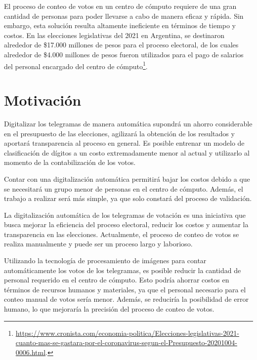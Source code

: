 El proceso de conteo de votos en un centro de cómputo requiere de una gran cantidad de personas para poder llevarse a
cabo de manera eficaz y rápida. Sin embargo, esta solución resulta altamente ineficiente en términos de tiempo y
costos. En las elecciones legislativas del 2021 en Argentina, se destinaron alrededor de \$17.000 millones de pesos
para el proceso electoral, de los cuales alrededor de \$4.000 millones de pesos fueron utilizados para el pago de
salarios del personal encargado del centro de
cómputo\footnote{\href{https://www.cronista.com/economia-politica/Elecciones-legislativas-2021-cuanto-mas-se-gastara-por-el-coronavirus-segun-el-Presupuesto-20201004-0006.html}{
        https://www.cronista.com/economia-politica/Elecciones-legislativas-2021-cuanto-mas-se-gastara-por-el-coronavirus-segun-el-Presupuesto-20201004-0006.html}.
}.

\section{Motivación}

Digitalizar los telegramas de manera automática supondrá un ahorro considerable en el presupuesto de las elecciones,
agilizará la obtención de los resultados y aportará transparencia al proceso en general. Es posible entrenar un modelo
de clasificación de dígitos a un costo extremadamente menor al actual y utilizarlo al momento de la contabilización de
los votos.

Contar con una digitalización automática permitirá bajar los costos debido a que se necesitará un grupo menor de
personas en el centro de cómputo. Además, el trabajo a realizar será más simple, ya que solo constará del proceso de
validación.

La digitalización automática de los telegramas de votación es una iniciativa que busca mejorar la eficiencia del
proceso electoral, reducir los costos y aumentar la transparencia en las elecciones. Actualmente, el proceso de conteo
de votos se realiza manualmente y puede ser un proceso largo y laborioso.

Utilizando la tecnología de procesamiento de imágenes para contar automáticamente los votos de los telegramas, es
posible reducir la cantidad de personal requerido en el centro de cómputo. Esto podría ahorrar costos en términos de
recursos humanos y materiales, ya que el personal necesario para el conteo manual de votos sería menor. Además, se
reduciría la posibilidad de error humano, lo que mejoraría la precisión del proceso de conteo de votos.

